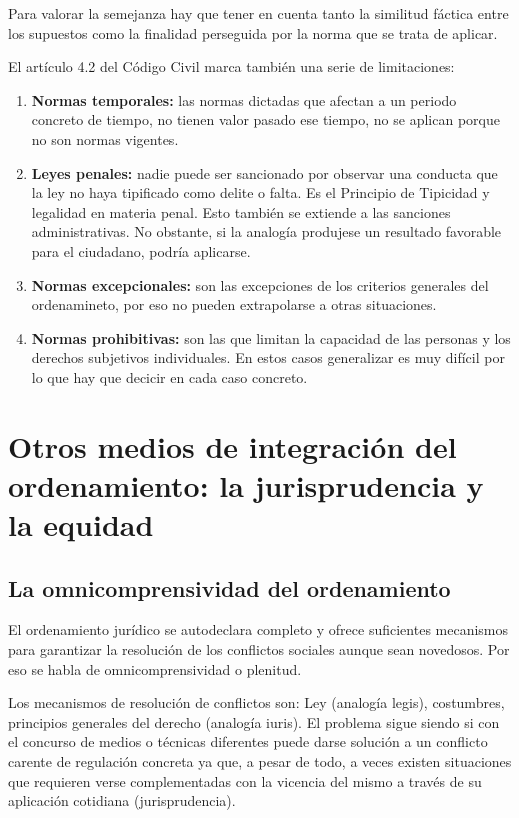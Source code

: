\documentclass[a4paper,12pt]{report}
\begin{document}
Para valorar la semejanza hay que tener en cuenta tanto la similitud fáctica entre los supuestos como la finalidad perseguida por la norma que se trata de aplicar.

El artículo 4.2 del Código Civil marca también una serie de limitaciones:

\begin{enumerate}
\item \textbf{Normas temporales:} las normas dictadas que afectan a un periodo concreto de tiempo, no tienen valor pasado ese tiempo, no se aplican porque no son normas vigentes.
\item \textbf{Leyes penales:} nadie puede ser sancionado por observar una conducta que la ley no haya tipificado como delite o falta. Es el Principio de Tipicidad y legalidad en materia penal. Esto también se extiende a las sanciones administrativas. No obstante, si la analogía produjese un resultado favorable para el ciudadano, podría aplicarse.
\item \textbf{Normas excepcionales:} son las excepciones de los criterios generales del ordenamineto, por eso no pueden extrapolarse a otras situaciones.
\item \textbf{Normas prohibitivas:} son las que limitan la capacidad de las personas y los derechos subjetivos individuales. En estos casos generalizar es muy difícil por lo que hay que decicir en cada caso concreto.
\end{enumerate}

\section{Otros medios de integración del ordenamiento: la jurisprudencia y la equidad}
\subsection{La omnicomprensividad del ordenamiento}
El ordenamiento jurídico se autodeclara completo y ofrece suficientes mecanismos para garantizar la resolución de los conflictos sociales aunque sean novedosos. Por eso se habla de omnicomprensividad o plenitud.

Los mecanismos de resolución de conflictos son: Ley (analogía legis), costumbres, principios generales del derecho (analogía iuris). El problema sigue siendo si con el concurso de medios o técnicas diferentes puede darse solución a un conflicto carente de regulación concreta ya que, a pesar de todo, a veces existen situaciones que requieren verse complementadas con la vicencia del mismo a través de su aplicación cotidiana (jurisprudencia).
\end{document}
